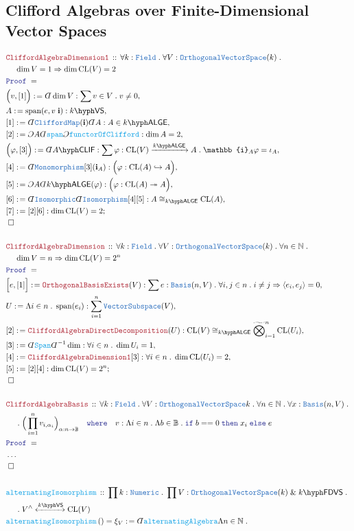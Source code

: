 \documentclass[12pt]{scrartcl}%
\newcommand{\TYPE}[1]{\textcolor{NavyBlue}{\mathtt{#1}}}%
\newcommand{\FUNC}[1]{\textcolor{Cerulean}{\mathtt{#1}}}%
\newcommand{\LOGIC}[1]{\textcolor{Blue}{\mathtt{#1}}}%
\newcommand{\THM}[1]{\textcolor{Maroon}{\mathtt{#1}}}%
\renewcommand{\.}{\; . \;} %
\newcommand{\de}{: \kern 0.1pc =} %
\newcommand{\where}{\LOGIC{where}} %
\newcommand{\If}{\LOGIC{if} \;} %
\newcommand{\Then}{ \; \LOGIC{then} \;} %
\newcommand{\Else}{\; \LOGIC{else} \;} %
\newcommand{\Act}[1]{\left( #1 \right)} %
\newcommand{\Theorem}[2]{& \THM{#1} \, :: \, #2 \\ & \Proof = \\ } %
\newcommand{\DeclareFunc}[2]{& \FUNC{#1} \, :: \, #2 \\}%
\newcommand{\DefineNamedFunc}[4]{&  \FUNC{#1}\Act{#2} = #3 \de #4 \\}%
\newcommand{\NewLine}{\\ & \kern 1pc}%
\newcommand{\Page}[1]{ \begin{align*} #1 \end{align*}  }%
\newcommand{ \bd }{ \ByDef }%
\newcommand{\NoProof}{ & \ldots \\ \EndProof}%
\renewcommand{\And}{\; \& \;}%
\newcommand{\Imply}{\Rightarrow}%
\newcommand{\Nat}{\mathbb{N}}%
\newcommand{\ToInj}{\hookrightarrow} %
\newcommand{\ToSurj}{\twoheadrightarrow} %
\newcommand{\Say}[3]{& #1 \de #2 : #3, \\} %
\newcommand{\Conclude}[3]{& #1 \de #2 : #3; \\}%
\newcommand{\QED}{\; \square} %
\newcommand{\EndProof}{& \QED \\} %
\newcommand{\ByDef}{\rotatebox[origin=c]{-180}{$D$}}%
\newcommand{\ByConstr}{\rotatebox[origin=c]{-180}{$C$}}%
\newcommand{\Proof}{\LOGIC{Proof} \; } %
\newcommand{\Arrow}[1]{\xrightarrow{#1}}%
\newcommand{\ToIso}[1]{\xleftrightarrow{#1}}%
\newcommand{\Basis}{\TYPE{Basis}} %
\newcommand{\OVS}{\TYPE{OrthogonalVectorSpace}}
\DeclareMathOperator{\Span}{span} %
\newcommand{\VS}[1]{#1\hyph\mathsf{VS}} %
\newcommand{\FDVS}[1]{#1\hyph\mathsf{FDVS}} %
\newcommand{\Field}{\TYPE{Field}}
\newcommand{\LALGE}[1]{#1\hyph\mathsf{ALGE}}%
\newcommand{\CLIF}[1]{#1\hyph\mathsf{CLIF}}%
\DeclareMathOperator{\CL}{CL}%
\begin{document}
\subsection{Clifford Algebras over Finite-Dimensional Vector Spaces}
\Page{
	\Theorem{CliffordAlgebraDimension1}
	{
		\forall k : \Field \.
		\forall V : \OVS(k) \.
		\NewLine 
		\dim V = 1 \Imply
		\dim \CL(V) = 2
	}
	\Say{\Big(v,[1]\Big)}{\bd \dim V}{\sum v \in V \. v \neq 0}
	\Say{A}{\Span(e,v\;\mathbf{i})}{  \VS{k}  }
	\Say{[1]}{\bd \TYPE{CliffordMap}(\mathbf{i}) \bd A }{ A \in \LALGE{k}  }
	\Say{[2]}{\ByConstr A \bd \FUNC{span} \ByConstr \FUNC{functorOfClifford}}{\dim A = 2}
	\Say{\Big( \varphi, [3]\Big)}{\bd \CLIF{A}}{
		\sum \varphi : \CL(V) \Arrow{\LALGE{k}} A \. \mathbb{i}_A \varphi = \iota_A
	}
	\Say{[4]}{\bd \TYPE{Monomorphism}[3](\mathbf{i}_A)}{\Big(\varphi : \CL(A) \ToInj A  \Big)}
	\Say{[5]}{\ByConstr A \bd \LALGE{k}(\varphi)}{\Big( \varphi : \CL(A) \ToSurj A  \Big)}
	\Say{[6]}{ \bd \TYPE{Isomorphic}\bd \TYPE{Isomorphism}[4][5]}{ A \cong_{\LALGE{k}} \CL(A)}
	\Conclude{[7]}{[2][6]}{ \dim \CL(V) = 2}
	\EndProof
	\\
	\Theorem{CliffordAlgebraDimension}
	{
		\forall k : \Field  \.
		\forall V : \OVS(k) \.
		\forall n \in \Nat  \.
		\NewLine 
		\dim V = n \Imply
		\dim \CL(V) = 2^n
	}
	\Say{\Big[ e, [1] \Big]}{ \THM{OrthogonalBasisExists} (V)   }
	{ \sum e : \Basis(n,V) \. \forall i,j \in n \. i \neq j \Rightarrow \langle e_i, e_j \rangle = 0 }
	\Say{U}{\Lambda i \in n \. \Span(e_i)}{ \sum^n_{i=1} \TYPE{VectorSubspace}(V)  }
	\Say{[2]}{\THM{CliffordAlgebraDirectDecomposition}(U)}
	{  \CL(V)  \cong_{\LALGE{k}} \widetilde{\bigotimes}^n_{i=1} \CL(U_i)   }
	\Say{[3]}{\bd \FUNC{Span} \bd^{-1} \dim }{\forall i \in n \. \dim U_i = 1}
	\Say{[4]}{\THM{CliffordAlgebraDimension1}[3]}{\forall i \in n \. \dim \CL(U_i) = 2 }
	\Conclude{[5]}{[2][4]}{ \dim \CL(V) = 2^n  }
	\EndProof
	\\
	\Theorem{CliffordAlgebraBasis}
	{
		\forall k : \Field \.
		\forall V : \OVS{k} \.
		\forall n \in \Nat \.
		\forall x : \Basis(n,V) \. \NewLine \.
		\Big( \prod^n_{i=1} v_{i,\alpha_i}  \Big)_{\alpha : n \to \mathbb{B}} 
		\quad \where \quad
		v : 
			\Lambda i \in n \. 
			\Lambda b \in \mathbb{B} \. 
			\If b == 0 \Then x_i \Else e
	}
	\NoProof
	\\
	\DeclareFunc{alternatingIsomorphism}
	{
		\prod k : \TYPE{Numeric} \.
		\prod V : \OVS(k) \And \FDVS{k} \. \NewLine \. 
		V^\wedge \ToIso{\VS{k}} \CL(V) 
	}
	\DefineNamedFunc{alternatingIsomorphism}{}{\xi_V}{
		\bd \FUNC{alternatingAlgebra} 
		\Lambda n \in \Nat \.
}}
\end{document}
